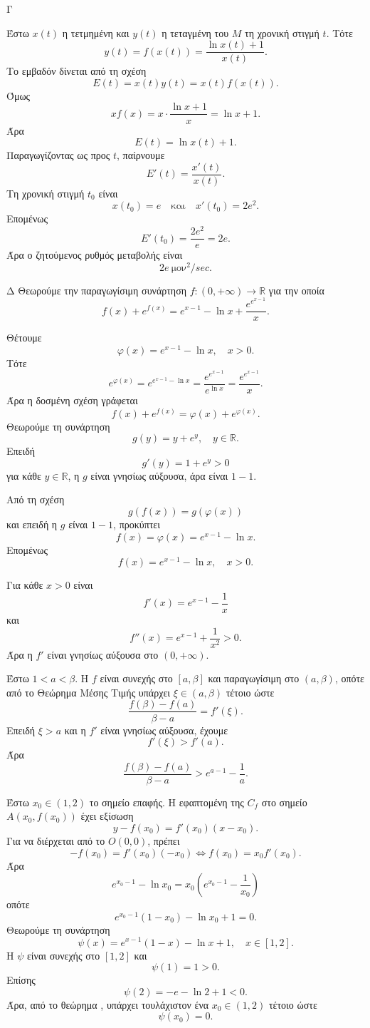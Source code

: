 \begin{thema}{Γ}
\begin{erwthma}
\item Έστω $x(t)$ η τετμημένη και $y(t)$ η τεταγμένη του $M$ τη χρονική στιγμή $t$. Τότε
\[
y(t)=f(x(t))=\frac{\ln x(t)+1}{x(t)}.
\]
Το εμβαδόν δίνεται από τη σχέση
\[
E(t)=x(t)y(t)=x(t)f(x(t)).
\]
Όμως
\[
xf(x)=x\cdot\frac{\ln x+1}{x}=\ln x+1.
\]
Άρα
\[
E(t)=\ln x(t)+1.
\]
Παραγωγίζοντας ως προς $t$, παίρνουμε
\[
E'(t)=\frac{x'(t)}{x(t)}.
\]
Τη χρονική στιγμή $t_0$ είναι
\[
x(t_0)=e
\quad\text{και}\quad
x'(t_0)=2e^2.
\]
Επομένως
\[
E'(t_0)=\frac{2e^2}{e}=2e.
\]
Άρα ο ζητούμενος ρυθμός μεταβολής είναι
\[
{2e\ \text{μον}^2/\si{sec}}.
\]
\end{erwthma}
\end{thema}

\begin{thema}{Δ}
Θεωρούμε την παραγωγίσιμη συνάρτηση $f:(0,+\infty)\to\mathbb{R}$ για την οποία
\[
f(x)+e^{f(x)}=e^{x-1}-\ln x+\frac{e^{e^{x-1}}}{x}.
\]
\begin{erwthma}
\item Θέτουμε
\[
\varphi(x)=e^{x-1}-\ln x,\quad x>0.
\]
Τότε
\[
e^{\varphi(x)}=e^{e^{x-1}-\ln x}
=\frac{e^{e^{x-1}}}{e^{\ln x}}
=\frac{e^{e^{x-1}}}{x}.
\]
Άρα η δοσμένη σχέση γράφεται
\[
f(x)+e^{f(x)}=\varphi(x)+e^{\varphi(x)}.
\]
Θεωρούμε τη συνάρτηση
\[
g(y)=y+e^y,\quad y\in\mathbb{R}.
\]
Επειδή
\[
g'(y)=1+e^y>0
\]
για κάθε $y\in\mathbb{R}$, η $g$ είναι γνησίως αύξουσα, άρα είναι $1-1$.

Από τη σχέση
\[
g(f(x))=g(\varphi(x))
\]
και επειδή η $g$ είναι $1-1$, προκύπτει
\[
f(x)=\varphi(x)=e^{x-1}-\ln x.
\]
Επομένως
\[
{f(x)=e^{x-1}-\ln x,\quad x>0}.
\]

\item Για κάθε $x>0$ είναι
\[
f'(x)=e^{x-1}-\frac{1}{x}
\]
και
\[
f''(x)=e^{x-1}+\frac{1}{x^2}>0.
\]
Άρα η $f'$ είναι γνησίως αύξουσα στο $(0,+\infty)$.

Έστω $1<a<\beta$. Η $f$ είναι συνεχής στο $[a,\beta]$ και παραγωγίσιμη στο $(a,\beta)$, οπότε από το Θεώρημα Μέσης Τιμής υπάρχει $\xi\in(a,\beta)$ τέτοιο ώστε
\[
\frac{f(\beta)-f(a)}{\beta-a}=f'(\xi).
\]
Επειδή $\xi>a$ και η $f'$ είναι γνησίως αύξουσα, έχουμε
\[
f'(\xi)>f'(a).
\]
Άρα
\[
\frac{f(\beta)-f(a)}{\beta-a}>e^{a-1}-\frac{1}{a}.
\]

\item Έστω $x_0\in(1,2)$ το σημείο επαφής. Η εφαπτομένη της $C_f$ στο σημείο $A(x_0,f(x_0))$ έχει εξίσωση
\[
y-f(x_0)=f'(x_0)(x-x_0).
\]
Για να διέρχεται από το $O(0,0)$, πρέπει
\[
-f(x_0)=f'(x_0)(-x_0)
\Leftrightarrow f(x_0)=x_0f'(x_0).
\]
Άρα
\[
e^{x_0-1}-\ln x_0
=x_0\left(e^{x_0-1}-\frac{1}{x_0}\right)
\]
οπότε
\[
e^{x_0-1}(1-x_0)-\ln x_0+1=0.
\]
Θεωρούμε τη συνάρτηση
\[
\psi(x)=e^{x-1}(1-x)-\ln x+1,\quad x\in[1,2].
\]
Η $\psi$ είναι συνεχής στο $[1,2]$ και
\[
\psi(1)=1>0.
\]
Επίσης
\[
\psi(2)=-e-\ln2+1<0.
\]
Άρα, από το θεώρημα , υπάρχει τουλάχιστον ένα $x_0\in(1,2)$ τέτοιο ώστε
\[
\psi(x_0)=0.
\]


\end{erwthma}
\end{thema}
